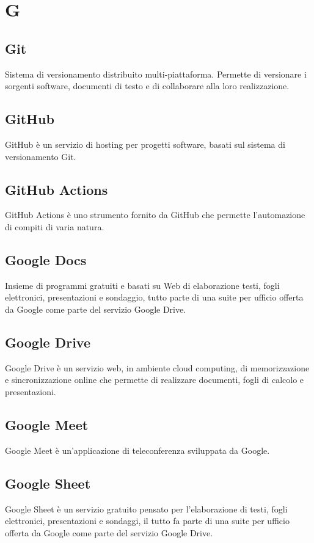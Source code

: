 \section{G}
	\subsection{Git}  
		Sistema di versionamento distribuito multi-piattaforma. Permette di versionare i sorgenti software, documenti di testo e di collaborare alla loro realizzazione.
	\subsection{GitHub}  
		GitHub è un servizio di hosting per progetti software, basati sul sistema di versionamento Git.
	\subsection{GitHub Actions}  
		GitHub Actions è uno strumento fornito da GitHub che permette l'automazione di compiti di varia natura.
	\subsection{Google Docs}
		Insieme di programmi gratuiti e basati su Web di elaborazione testi, fogli elettronici, presentazioni e sondaggio, tutto parte di una suite per ufficio offerta da Google come parte del servizio Google Drive.
	\subsection{Google Drive}  
		Google Drive è un servizio web, in ambiente cloud computing, di memorizzazione e sincronizzazione online che permette di realizzare documenti, fogli di calcolo e presentazioni.
	\subsection{Google Meet}
		Google Meet è un'applicazione di teleconferenza sviluppata da Google.
	\subsection{Google Sheet}
		Google Sheet è un servizio gratuito pensato per l'elaborazione di testi, fogli elettronici, presentazioni e sondaggi, il tutto fa parte di una suite per ufficio offerta da Google come parte del servizio Google Drive.
		
	
		



\newpage